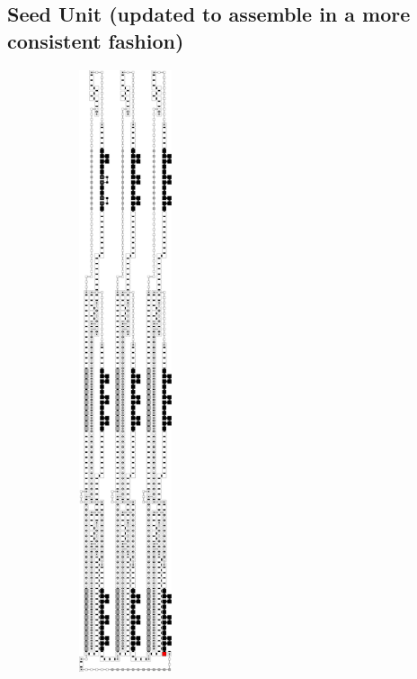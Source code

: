     \subsection{Seed Unit (updated to assemble in a more consistent fashion)}

    \begin{figure}[H]
        \centering
        \begin{subfigure}[t]{0.3\textwidth}
            \centering
            \includegraphics[width=0.3\textwidth]{seed/seed_overview_case3}

\end{subfigure}
\end{figure}
